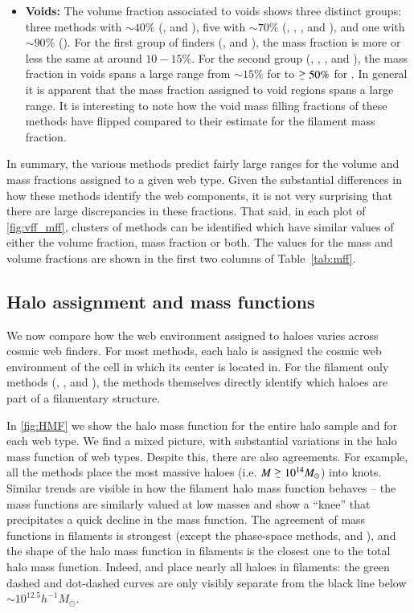 \begin{itemize}
\item {\bf Voids:} The volume fraction associated to voids shows three distinct groups: three methods with $\sim 40\%$ (\disperse{}, \spine{} and \tweb{}), five with $\sim 70\%$ (\nexus{}, \origami{}, \vweb{}, \mmft{} and \classic{}), and one with $\sim90\%$ (\mswa{}).  For the first group of finders (\disperse{}, \spine{} and \tweb{}), the mass fraction is more or less the same at around $10-15\%$. For the second group (\nexus{}, \origami{}, \vweb{}, \mmft{} and \classic{}), the mass fraction in voids spans a large range from $\sim 15\%$ for \nexus{} to $\gsim50\%$ for \mmft{}. In general it is apparent that the mass fraction assigned to void regions spans a large range. It is interesting to note how the void mass filling fractions of these methods have flipped compared to their estimate for the filament mass fraction.
\end{itemize}

In summary, the various methods predict fairly large ranges for the volume and mass fractions assigned to a given web type. Given the substantial differences in how these methods identify the web components, it is not very surprising that there are large discrepancies in these fractions. That said, in each plot of \autoref{fig:vff_mff}, clusters of methods can be identified which have similar values of either the volume fraction, mass fraction or both. The values for the mass and volume fractions are shown in the first two columns of Table~\ref{tab:mff}.

\subsection{Halo assignment and mass functions}
We now compare how the web environment assigned to haloes varies across cosmic web finders.  For most methods, each halo is assigned the cosmic web environment of the cell in which its center is located in. For the filament only methods (\bisous{}, \fine{}, and \mst{}), the methods themselves directly identify which haloes are part of a filamentary structure. 

In \autoref{fig:HMF} we show the halo mass function for the entire halo sample and for each web type. We find a mixed picture, with substantial variations in the halo mass function of web types. Despite this, there are also agreements. For example, all the methods place the most massive haloes (i.e. $M \gsim 10^{14}M_{\odot}$) into knots. Similar trends are visible in how the filament halo mass function behaves -- the mass functions are similarly valued at low masses and show a ``knee'' that precipitates a quick decline in the mass function. The agreement of mass functions in filaments is strongest (except the phase-space methods, \origami{} and \mswa{}), and the shape of the halo mass function in filaments is the closest one to the total halo mass function. Indeed, \mmft{} and \spine{} place nearly all haloes in filaments: the green dashed and dot-dashed curves are only visibly separate from the black line below $\sim10^{12.5}h^{-1}M_{\odot}$.

